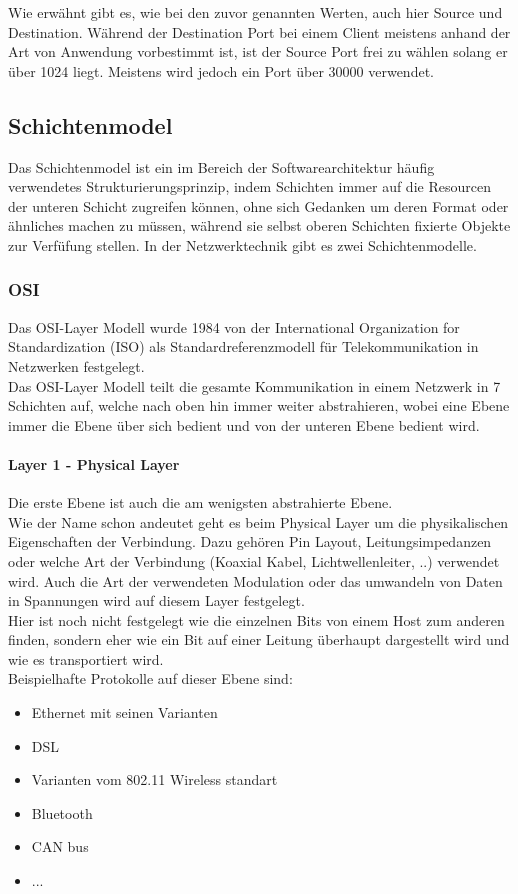 \documentclass[11pt,a4paper]{report}
\begin{document}
Wie erwähnt gibt es, wie bei den zuvor genannten Werten, auch hier Source und Destination. Während der Destination Port bei einem Client meistens anhand der Art von Anwendung vorbestimmt ist, ist der Source Port frei zu wählen solang er über 1024 liegt. Meistens wird jedoch ein Port über 30000 verwendet. 
\subsection{Schichtenmodel}
Das Schichtenmodel ist ein im Bereich der Softwarearchitektur häufig verwendetes Strukturierungsprinzip, indem Schichten immer auf die Resourcen der unteren Schicht zugreifen können, ohne sich Gedanken um deren Format oder ähnliches machen zu müssen, während sie selbst oberen Schichten fixierte Objekte zur Verfüfung stellen. In der Netzwerktechnik gibt es zwei Schichtenmodelle.
\subsubsection{OSI}
Das OSI-Layer Modell wurde 1984 von der International Organization for Standardization (ISO) als Standardreferenzmodell für Telekommunikation in Netzwerken festgelegt.\\
Das OSI-Layer Modell teilt die gesamte Kommunikation in einem Netzwerk in 7 Schichten auf, welche nach oben hin immer weiter abstrahieren, wobei eine Ebene immer die Ebene über sich bedient und von der unteren Ebene bedient wird.\\
\paragraph{Layer 1 - Physical Layer}
Die erste Ebene ist auch die am wenigsten abstrahierte Ebene.\\
Wie der Name schon andeutet geht es beim Physical Layer um die physikalischen Eigenschaften der Verbindung. Dazu gehören Pin Layout, Leitungsimpedanzen oder welche Art der Verbindung (Koaxial Kabel, Lichtwellenleiter, ..) verwendet wird. Auch die Art der verwendeten Modulation oder das umwandeln von Daten in Spannungen wird auf diesem Layer festgelegt.\\ Hier ist noch nicht festgelegt wie die einzelnen Bits von einem Host zum anderen finden, sondern eher wie ein Bit auf einer Leitung überhaupt dargestellt wird und wie es transportiert wird.\\

Beispielhafte Protokolle auf dieser Ebene sind:
\begin{itemize}
\item Ethernet mit seinen Varianten
\item DSL 
\item Varianten vom 802.11 Wireless standart
\item Bluetooth
\item CAN bus
\item ...
\end{itemize}
\end{document}
